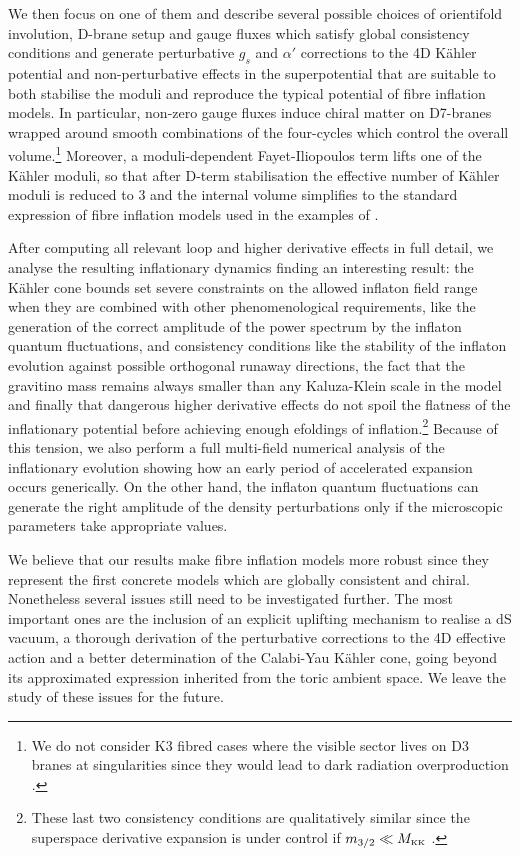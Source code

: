 \documentclass[11pt,a4paper]{article}
\def\KK{{\scriptscriptstyle \rm KK}}
\begin{document}
We then focus on one of them and describe several possible choices of orientifold involution, D-brane setup and gauge fluxes which satisfy global consistency conditions and generate perturbative $g_s$ and $\alpha'$ corrections to the 4D K\"ahler potential and non-perturbative effects in the superpotential that are suitable to both stabilise the moduli and reproduce the typical potential of fibre inflation models. In particular, non-zero gauge fluxes induce chiral matter on D7-branes wrapped around smooth combinations of the four-cycles which control the overall volume.\footnote{We do not consider K3 fibred cases where the visible sector lives on D3 branes at singularities since they would lead to dark radiation overproduction \cite{Angus:2014bia}.} Moreover, a moduli-dependent Fayet-Iliopoulos term lifts one of the K\"ahler moduli, so that after D-term stabilisation the effective number of K\"ahler moduli is reduced to $3$ and the internal volume simplifies to the standard expression of fibre inflation models used in the examples of \cite{Cicoli:2016xae}.

After computing all relevant loop and higher derivative effects in full detail, we analyse the resulting inflationary dynamics finding an interesting result: the K\"ahler cone bounds set severe constraints on the allowed inflaton field range when they are combined with other phenomenological requirements, like the generation of the correct amplitude of the power spectrum by the inflaton quantum fluctuations, and consistency conditions like the stability of the inflaton evolution against possible orthogonal runaway directions, the fact that the gravitino mass remains always smaller than any Kaluza-Klein scale in the model and finally that dangerous higher derivative effects do not spoil the flatness of the inflationary potential before achieving enough efoldings of inflation.\footnote{These last two consistency conditions are qualitatively similar since the superspace derivative expansion is under control if $m_{3/2}\ll M_\KK$ \cite{Cicoli:2013swa}.} Because of this tension, we also perform a full multi-field numerical analysis of the inflationary evolution showing how an early period of accelerated expansion occurs generically. On the other hand, the inflaton quantum fluctuations can generate the right amplitude of the density perturbations only if the microscopic parameters take appropriate values. 

We believe that our results make fibre inflation models more robust since they represent the first concrete models which are globally consistent and chiral. Nonetheless several issues still need to be investigated further. The most important ones are the inclusion of an explicit uplifting mechanism to realise a dS vacuum, a thorough derivation of the perturbative corrections to the 4D effective action and a better determination of the Calabi-Yau K\"ahler cone, going beyond its approximated expression inherited from the toric ambient space. We leave the study of these issues for the future. 
\end{document}
